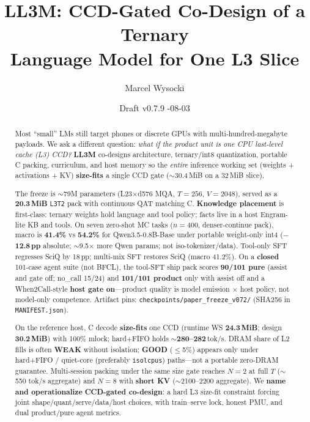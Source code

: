 \documentclass[11pt,a4paper]{article}
\title{\textbf{LL3M: CCD-Gated Co-Design of a Ternary\\Language Model for One L3 Slice}}
\author{
  Marcel Wysocki
}
\date{Draft v0.7.9 \quad 2026-08-03}
\begin{document}
\maketitle

\begin{abstract}
Most ``small'' LMs still target phones or discrete GPUs with multi-hundred-megabyte payloads.
We ask a different question: \emph{what if the product unit is one CPU last-level cache (L3) CCD?}
\textbf{LL3M} co-designs architecture, ternary/int8 quantization, portable C packing, curriculum, and host memory so the \emph{entire} inference working set (weights + activations + KV) \textbf{size-fits} a single CCD gate ($\sim$30.4\,MiB on a 32\,MiB slice).

The freeze is $\sim$79M parameters (L23$\times$d576 MQA, $T{=}256$, $V{=}2048$), served as a \textbf{20.3\,MiB} \texttt{L3T2} pack with continuous QAT matching C.
\textbf{Knowledge placement} is first-class: ternary weights hold language and tool policy; facts live in a host Engram-lite KB and tools.
On seven zero-shot MC tasks ($n{=}400$, denser-continue pack), macro is \textbf{41.4\%} vs \textbf{54.2\%} for Qwen3.5-0.8B-Base under portable weight-only int4 (\textbf{$-$12.8\,pp} absolute; $\sim$9.5$\times$ more Qwen params; not iso-tokenizer/data).
Tool-only SFT regresses SciQ by 18\,pp; multi-mix SFT restores SciQ (macro 41.2\%).
On a \textbf{closed} 101-case agent suite (not BFCL), the tool-SFT ship pack scores \textbf{90/101 pure} (assist and gate off; no\_call 15/24) and \textbf{101/101 product} only with assist off and a When2Call-style \textbf{host gate on}---product quality is model emission $\times$ host policy, not model-only competence.
Artifact pins: \texttt{checkpoints/paper\_freeze\_v072/} (SHA256 in \texttt{MANIFEST.json}).

On the reference host, C decode \textbf{size-fits} one CCD (runtime WS \textbf{24.3\,MiB}; design \textbf{30.2\,MiB}) with 100\% mlock; hard+FIFO holds $\sim$\textbf{280--282}\,tok/s.
DRAM share of L2 fills is often \textbf{WEAK} without isolation; \textbf{GOOD} ($\le$5\%) appears only under hard+FIFO / quiet-core (preferably \texttt{isolcpus}) paths---not a portable zero-DRAM guarantee.
Multi-session packing under the same size gate reaches $N{=}2$ at full $T$ ($\sim$550 tok/s aggregate) and $N{=}8$ with \textbf{short KV} ($\sim$2100--2200 aggregate).
We \textbf{name and operationalize} \textbf{CCD-gated co-design}: a hard L3 size-fit constraint forcing joint shape/quant/serve/data/host choices, with train--serve lock, honest PMU, and dual product/pure agent metrics.
\end{abstract}
\end{document}
